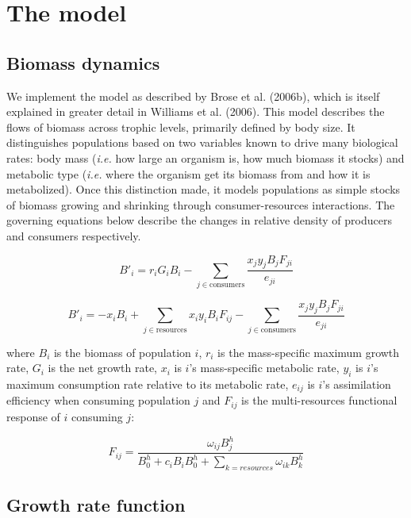 \documentclass[12pt]{article}
\begin{document}
\section{The model}\label{the-model}

\subsection{Biomass dynamics}\label{biomass-dynamics}

We implement the model as described by Brose et al. (2006b), which is
itself explained in greater detail in Williams et al. (2006). This model
describes the flows of biomass across trophic levels, primarily defined
by body size. It distinguishes populations based on two variables known
to drive many biological rates: body mass (\emph{i.e.} how large an
organism is, how much biomass it stocks) and metabolic type (\emph{i.e.}
where the organism get its biomass from and how it is metabolized). Once
this distinction made, it models populations as simple stocks of biomass
growing and shrinking through consumer-resources interactions. The
governing equations below describe the changes in relative density of
producers and consumers respectively.

\begin{equation}\label{e:producer}
B'_i = r_i G_i B_i -\sum_{j \in \text{consumers}}\frac{x_jy_jB_jF_{ji}}{e_{ji}}
\end{equation}

\begin{equation}\label{e:consumer}
B'_i = -x_iB_i+\sum_{j \in \text{resources}} x_iy_iB_iF_{ij}-\sum_{j \in \text{consumers}}\frac{x_jy_jB_jF_{ji}}{e_{ji}}
\end{equation}

where \(B_i\) is the biomass of population \(i\), \(r_i\) is the
mass-specific maximum growth rate, \(G_i\) is the net growth rate,
\(x_i\) is \(i\)'s mass-specific metabolic rate, \(y_i\) is \(i\)'s
maximum consumption rate relative to its metabolic rate, \(e_{ij}\) is
\(i\)'s assimilation efficiency when consuming population \(j\) and
\(F_{ij}\) is the multi-resources functional response of \(i\) consuming
\(j\):

\begin{equation}\label{e:func_resp}
F_{ij}=\frac {\omega_{ij}B_{j}^{h}}{B_{0}^{h}+c_iB_iB_{0}^{h}+\sum_{k=resources}\omega_{ik}B_{k}^{h}}
\end{equation}

\subsection{Growth rate function}\label{growth-rate-function}
\end{document}
